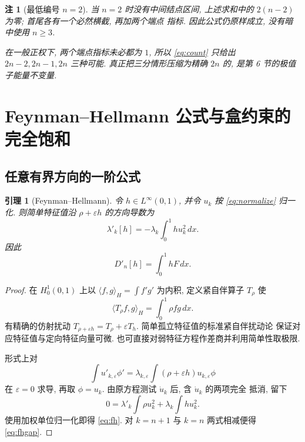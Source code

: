 \documentclass[UTF8]{ctexart}
\newtheorem{lemma}[theorem]{引理}
\newtheorem{remark}[theorem]{注}
\begin{document}
\begin{remark}[最低编号 $n=2$]\label{rem:n2}
当 $n=2$ 时没有中间结点区间, 上述求和中的 $2(n-2)$ 为零; 首尾各有一个必然横截, 再加两个端点
指标. 因此公式仍原样成立, 没有暗中使用 $n\ge3$.

在一般正权下, 两个端点指标未必都为 $1$, 所以 \eqref{eq:count} 只给出 $2n-2,2n-1,2n$ 三种可能.
真正把三分情形压缩为精确 $2n$ 的, 是第 6 节的极值子能量不变量.
\end{remark}

\section{Feynman--Hellmann 公式与盒约束的完全饱和}
\subsection{任意有界方向的一阶公式}

\begin{lemma}[Feynman--Hellmann]\label{lem:fh}
令 $h\in L^\infty(0,1)$, 并令 $u_k$ 按 \eqref{eq:normalize} 归一化. 则简单特征值沿
$\rho+\varepsilon h$ 的方向导数为
\begin{equation}
	\lambda'_k[h]=-\lambda_k\int_0^1 hu_k^2\,dx .
	\label{eq:fh}
\end{equation}
因此
\begin{equation}
	D'_n[h]=\int_0^1 hF\,dx .
	\label{eq:fhgap}
\end{equation}
\end{lemma}

\begin{proof}
在 $H^1_0(0,1)$ 上以 $\langle f,g\rangle_H=\int f'g'$ 为内积, 定义紧自伴算子 $T_\rho$ 使
\begin{equation*}
	\langle T_\rho f,g\rangle_H=\int_0^1\rho fg\,dx .
\end{equation*}
有精确的仿射扰动 $T_{\rho+\varepsilon h}=T_\rho+\varepsilon T_h$. 简单孤立特征值的标准紧自伴扰动论
保证对应特征值与定向特征向量可微. 也可直接对弱特征方程作差商并利用简单性取极限.

形式上对
\begin{equation*}
	\int u'_{k,\varepsilon}\phi'=\lambda_{k,\varepsilon}\int(\rho+\varepsilon h)u_{k,\varepsilon}\phi
\end{equation*}
在 $\varepsilon=0$ 求导, 再取 $\phi=u_k$. 由原方程测试 $\dot u_k$ 后, 含 $\dot u_k$ 的两项完全
抵消, 留下
\begin{equation*}
	0=\lambda'_k\int\rho u_k^2+\lambda_k\int hu_k^2 .
\end{equation*}
使用加权单位归一化即得 \eqref{eq:fh}. 对 $k=n+1$ 与 $k=n$ 两式相减便得 \eqref{eq:fhgap}.
\end{proof}
\end{document}
